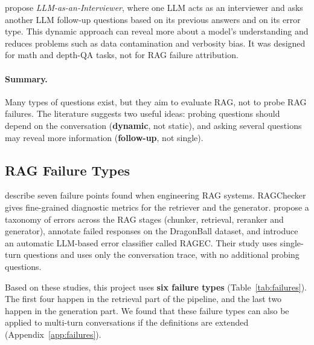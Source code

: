 \documentclass[11pt]{article}
\begin{document}
\citet{kim2024interviewer} propose \emph{LLM-as-an-Interviewer}, where one LLM acts as an interviewer and asks another LLM follow-up questions based on its previous answers and on its error type. This dynamic approach can reveal more about a model's understanding and reduces problems such as data contamination and verbosity bias. It was designed for math and depth-QA tasks, not for RAG failure attribution.

\paragraph{Summary.}
Many types of questions exist, but they aim to evaluate RAG, not to probe RAG failures. The literature suggests two useful ideas: probing questions should depend on the conversation (\textbf{dynamic}, not static), and asking several questions may reveal more information (\textbf{follow-up}, not single).

\subsection{RAG Failure Types}
\citet{barnett2024seven} describe seven failure points found when engineering RAG systems. RAGChecker \citep{ru2024ragchecker} gives fine-grained diagnostic metrics for the retriever and the generator. \citet{leung2025ragec} propose a taxonomy of errors across the RAG stages (chunker, retrieval, reranker and generator), annotate failed responses on the DragonBall dataset, and introduce an automatic LLM-based error classifier called RAGEC. Their study uses single-turn questions and uses only the conversation trace, with no additional probing questions.

Based on these studies, this project uses \textbf{six failure types} (Table~\ref{tab:failures}). The first four happen in the retrieval part of the pipeline, and the last two happen in the generation part. We found that these failure types can also be applied to multi-turn conversations if the definitions are extended (Appendix~\ref{app:failures}).
\end{document}
